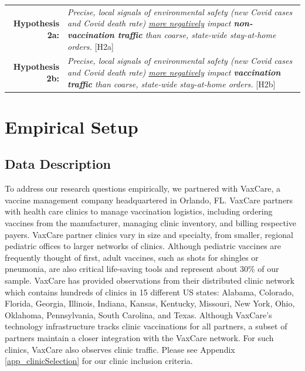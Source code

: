  \medskip \noindent
 \begin{tabularx}{\linewidth}{ r X }
    \textbf{Hypothesis 2a:} & \textit{Precise, local signals of environmental safety (new Covid cases and Covid death rate) \underline{more negatively} impact \textbf{non-vaccination traffic} than coarse, state-wide stay-at-home orders.} [H2a]  \\
    \textbf{Hypothesis 2b:} & \textit{Precise, local signals of environmental safety (new Covid cases and Covid death rate) \underline{more negatively} impact \textbf{vaccination traffic} than coarse, state-wide stay-at-home orders.} [H2b] 
 \end{tabularx}   %
 
 
\section{Empirical Setup} \label{VC2_Emp}
\subsection{Data Description} \label{data}
 To address our research questions empirically, we partnered with VaxCare, a vaccine management company headquartered in Orlando, FL. VaxCare partners with health care clinics to manage vaccination logistics, including ordering vaccines from the manufacturer, managing clinic inventory, and billing respective payers. VaxCare partner clinics vary in size and specialty, from smaller, regional pediatric offices to larger networks of clinics. Although pediatric vaccines are frequently thought of first, adult vaccines, such as shots for shingles or pneumonia, are also critical life-saving tools and represent about 30\% of our sample. VaxCare has provided observations from their distributed clinic network which contains hundreds of clinics in 15 different US states: Alabama, Colorado, Florida, Georgia, Illinois, Indiana, Kansas, Kentucky, Missouri, New York, Ohio, Oklahoma, Pennsylvania, South Carolina, and Texas. Although VaxCare’s technology infrastructure tracks clinic vaccinations for all partners, a subset of partners maintain a closer integration with the VaxCare network. For such clinics, VaxCare also observes clinic traffic. Please see Appendix \ref{app_clinicSelection} for our clinic inclusion criteria.
 
